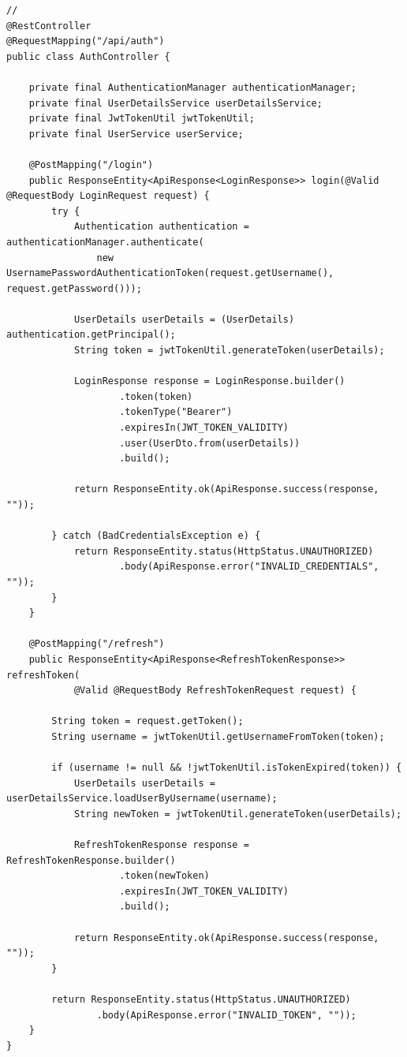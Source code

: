 \begin{lstlisting}[style=java]
// 
@RestController
@RequestMapping("/api/auth")
public class AuthController {
    
    private final AuthenticationManager authenticationManager;
    private final UserDetailsService userDetailsService;
    private final JwtTokenUtil jwtTokenUtil;
    private final UserService userService;
    
    @PostMapping("/login")
    public ResponseEntity<ApiResponse<LoginResponse>> login(@Valid @RequestBody LoginRequest request) {
        try {
            Authentication authentication = authenticationManager.authenticate(
                new UsernamePasswordAuthenticationToken(request.getUsername(), request.getPassword()));
                
            UserDetails userDetails = (UserDetails) authentication.getPrincipal();
            String token = jwtTokenUtil.generateToken(userDetails);
            
            LoginResponse response = LoginResponse.builder()
                    .token(token)
                    .tokenType("Bearer")
                    .expiresIn(JWT_TOKEN_VALIDITY)
                    .user(UserDto.from(userDetails))
                    .build();
                    
            return ResponseEntity.ok(ApiResponse.success(response, ""));
            
        } catch (BadCredentialsException e) {
            return ResponseEntity.status(HttpStatus.UNAUTHORIZED)
                    .body(ApiResponse.error("INVALID_CREDENTIALS", ""));
        }
    }
    
    @PostMapping("/refresh")
    public ResponseEntity<ApiResponse<RefreshTokenResponse>> refreshToken(
            @Valid @RequestBody RefreshTokenRequest request) {
        
        String token = request.getToken();
        String username = jwtTokenUtil.getUsernameFromToken(token);
        
        if (username != null && !jwtTokenUtil.isTokenExpired(token)) {
            UserDetails userDetails = userDetailsService.loadUserByUsername(username);
            String newToken = jwtTokenUtil.generateToken(userDetails);
            
            RefreshTokenResponse response = RefreshTokenResponse.builder()
                    .token(newToken)
                    .expiresIn(JWT_TOKEN_VALIDITY)
                    .build();
                    
            return ResponseEntity.ok(ApiResponse.success(response, ""));
        }
        
        return ResponseEntity.status(HttpStatus.UNAUTHORIZED)
                .body(ApiResponse.error("INVALID_TOKEN", ""));
    }
}
\end{lstlisting}


